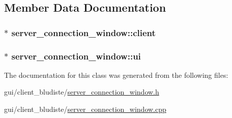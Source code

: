 \subsection{Member Data Documentation}
\hypertarget{classserver__connection__window_aedf2c1c7bec9b66101617dfd75cc61cc}{
\subsubsection[{client}]{$\ast$ server\-\_\-connection\-\_\-window\-::client\hspace{0.3cm}{\ttfamily [private]}}}\label{classserver__connection__window_aedf2c1c7bec9b66101617dfd75cc61cc}
\hypertarget{classserver__connection__window_aafa54aec3e044c301c95915b68aae75f}{
\subsubsection[{ui}]{$\ast$ server\-\_\-connection\-\_\-window\-::ui\hspace{0.3cm}{\ttfamily [private]}}}\label{classserver__connection__window_aafa54aec3e044c301c95915b68aae75f}


The documentation for this class was generated from the following files\-:\begin{DoxyCompactItemize}
\item 
gui/client\-\_\-bludiste/\hyperlink{server__connection__window_8h}{server\-\_\-connection\-\_\-window.\-h}\item 
gui/client\-\_\-bludiste/\hyperlink{server__connection__window_8cpp}{server\-\_\-connection\-\_\-window.\-cpp}\end{DoxyCompactItemize}
